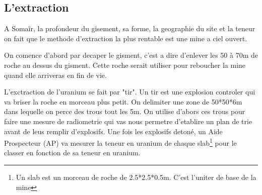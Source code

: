 \subsection{L'extraction}
\label{ssec_extraction}
A Somaïr, la profondeur du gisement, sa forme, la geographie du site et la teneur on fait que le methode d'extraction la plus rentable est une mine a ciel ouvert.

On comence d'abord par decaper le gisment, c'est a dire d'enlever les 50 à 70m de roche au dessus du gisment. Cette roche serait utiliser pour reboucher la mine quand elle arriveras en fin de vie.

L'exctraction de l'uranium se fait par "tir". Un tir est une explosion controler qui va briser la roche en morceau plus petit. On delimiter une zone de 50*50*6m dans lequelle on perce des trous tout les 5m. On utilise d'abors ces trous pour faire une mesure de radiometrie qui vas nous permetre d'etablire un plan de trie avant de leus remplir d'explosifs. Une fois les explosifs detoné, un Aide Prospecteur (AP) va mesurer la teneur en uranium de chaque slab\footnote{Un slab est un morceau de roche de 2.5*2.5*0.5m. C'est l'uniter de base de la mine} pour le classer en fonction de sa teneur en uranium.


